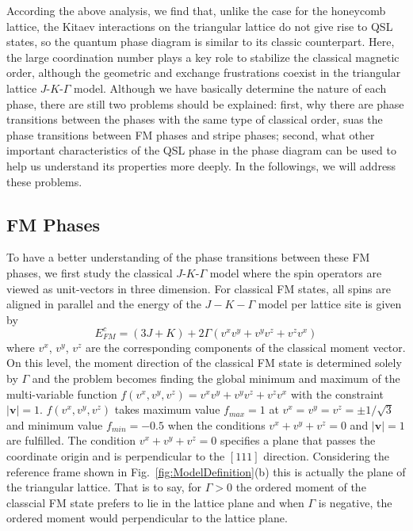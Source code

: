 \documentclass[aps,prb,reprint,amsfonts,amsmath,amssymb,showpacs,groupedaddress,superscriptaddress]{revtex4-1}
\begin{document}
According the above analysis, we find that, unlike the case for the honeycomb lattice, the Kitaev interactions on the triangular lattice do not give rise to QSL states, so the quantum phase diagram is similar to its classic counterpart. Here, the large coordination number plays a key role to stabilize the classical magnetic order, although the geometric and exchange frustrations coexist in the triangular lattice $J$-$K$-$\Gamma$ model. Although we have basically determine the nature of each phase, there are still two problems should be explained: first, why there are phase transitions between the phases with the same type of classical order, suas the phase transitions between FM phases and stripe phases; second, what other important characteristics of the QSL phase in the phase diagram can be used to help us understand its properties more deeply. In the followings, we will address these problems.

\subsection{\label{subsec:FMPhases}FM Phases}

To have a better understanding of the phase transitions between these FM phases, we first study the classical $J$-$K$-$\Gamma$ model where the spin operators are viewed as unit-vectors in three dimension. For classical FM states, all spins are aligned in parallel and the energy of the $J-K-\Gamma$ model per lattice site is given by
\begin{equation}
    E_{FM}^{c} = (3J + K) + 2 \Gamma (v^x v^y + v^y v^z + v^z v^x) \label{eq:EcFM}
\end{equation}
where $v^x$, $v^y$, $v^z$ are the corresponding components of the classical moment vector. On this level, the moment direction of the classical FM state is determined solely by $\Gamma$ and the problem becomes finding the global minimum and maximum of the multi-variable function $f(v^x, v^y, v^z) = v^x v^y + v^y v^z + v^z v^x$ with the constraint $|\bm{v}| = 1$. $f(v^x, v^y, v^z)$ takes maximum value $f_{max}=1$ at $v^x=v^y=v^z=\pm 1/\sqrt{3}$ and minimum value $f_{min}=-0.5$ when the conditions $v^x + v^y + v^z = 0$ and $|\bm{v}| = 1$ are fulfilled. The condition $v^x + v^y + v^z = 0$ specifies a plane that passes the coordinate origin and is perpendicular to the $[111]$ direction. Considering the reference frame shown in Fig.~\ref{fig:ModelDefinition}(b) this is actually the plane of the triangular lattice. That is to say, for $\Gamma > 0$ the ordered moment of the classcial FM state prefers to lie in the lattice plane and when $\Gamma$ is negative, the ordered moment would perpendicular to the lattice plane.
\end{document}
